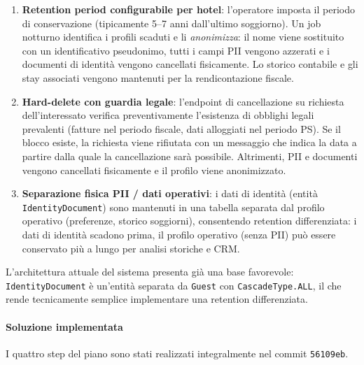 ﻿\documentclass[a4paper,12pt]{report}
\begin{document}
\begin{enumerate}
  \item \textbf{Retention period configurabile per hotel}: l'operatore imposta
        il periodo di conservazione (tipicamente 5--7 anni dall'ultimo
        soggiorno). Un job notturno identifica i profili scaduti e li
        \emph{anonimizza}: il nome viene sostituito con un identificativo
        pseudonimo, tutti i campi PII vengono azzerati e i documenti di
        identità vengono cancellati fisicamente. Lo storico contabile e gli
        stay associati vengono mantenuti per la rendicontazione fiscale.
  \item \textbf{Hard-delete con guardia legale}: l'endpoint di cancellazione
        su richiesta dell'interessato verifica preventivamente l'esistenza di
        obblighi legali prevalenti (fatture nel periodo fiscale, dati alloggiati
        nel periodo PS). Se il blocco esiste, la richiesta viene rifiutata con
        un messaggio che indica la data a partire dalla quale la cancellazione
        sarà possibile. Altrimenti, PII e documenti vengono cancellati
        fisicamente e il profilo viene anonimizzato.
  \item \textbf{Separazione fisica PII / dati operativi}: i dati di identità
        (entità \texttt{IdentityDocument}) sono mantenuti in una tabella
        separata dal profilo operativo (preferenze, storico soggiorni),
        consentendo retention differenziata: i dati di identità scadono prima,
        il profilo operativo (senza PII) può essere conservato più a lungo per
        analisi storiche e CRM.
\end{enumerate}

\noindent
L'architettura attuale del sistema presenta già una base favorevole:
\texttt{IdentityDocument} è un'entità separata da \texttt{Guest} con
\texttt{CascadeType.ALL}, il che rende tecnicamente semplice implementare una
retention differenziata.

\paragraph{Soluzione implementata}

I quattro step del piano sono stati realizzati integralmente nel
commit \texttt{56109eb}.
\end{document}
